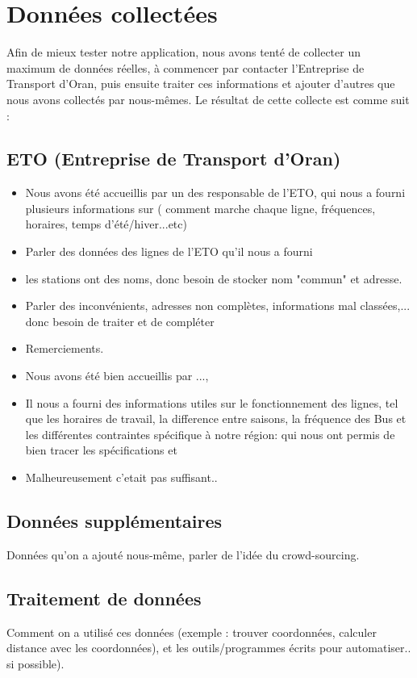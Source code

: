 \section{Données collectées}
Afin de mieux tester notre application, nous avons tenté de collecter un maximum de données réelles, à commencer par contacter l'Entreprise de Transport d'Oran, puis ensuite traiter ces informations et ajouter d'autres que nous avons collectés par nous-mêmes.
Le résultat de cette collecte est comme suit :

\subsection{ETO (Entreprise de Transport d'Oran)}
\begin{itemize}
	\item Nous avons été accueillis par un des responsable de l'ETO, qui nous a fourni plusieurs informations sur ( comment marche chaque ligne, fréquences, horaires, temps d'été/hiver...etc)
	\item Parler des données des lignes de l'ETO qu'il nous a fourni
	\item les stations ont des noms, donc besoin de stocker nom "commun" et adresse.
	\item Parler des inconvénients, adresses non complètes, informations mal classées,... donc besoin de traiter et de compléter
	\item Remerciements. %
\end{itemize}

\begin{itemize}
	\item Nous avons été bien accueillis par ..., 
	\item Il nous a fourni des informations utiles sur le fonctionnement des lignes, tel que les horaires de travail, la difference entre saisons, la fréquence des Bus et les différentes contraintes spécifique à notre région: qui nous ont permis de bien tracer les spécifications et 
	\item Malheureusement c'etait pas suffisant..
	\
\end{itemize}

\subsection{Données supplémentaires}
Données qu'on a ajouté nous-même, parler de l'idée du crowd-sourcing.

\subsection{Traitement de données}
Comment on a utilisé ces données (exemple : trouver coordonnées, calculer distance avec les coordonnées), et les outils/programmes écrits pour automatiser.. si possible).
	
